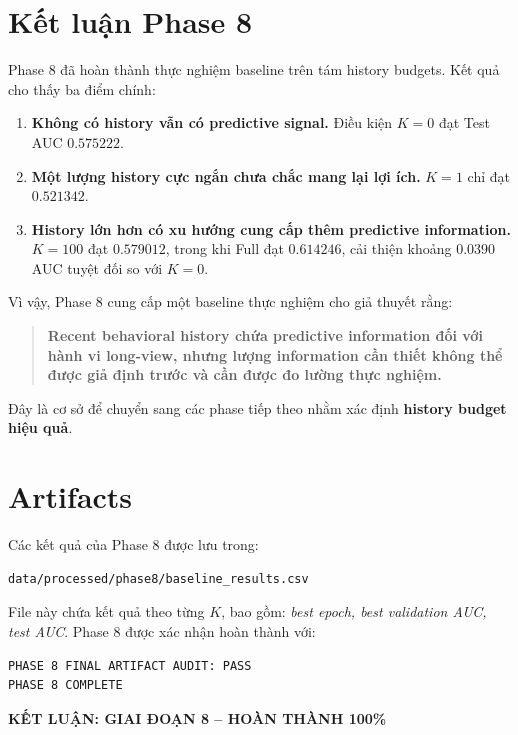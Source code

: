 \documentclass[12pt,a4paper]{article}
\begin{document}
\section{Kết luận Phase 8}

Phase 8 đã hoàn thành thực nghiệm baseline trên tám history budgets. Kết quả cho thấy ba điểm chính:
\begin{enumerate}
    \item \textbf{Không có history vẫn có predictive signal.} Điều kiện $K=0$ đạt Test AUC $0.575222$.
    \item \textbf{Một lượng history cực ngắn chưa chắc mang lại lợi ích.} $K=1$ chỉ đạt $0.521342$.
    \item \textbf{History lớn hơn có xu hướng cung cấp thêm predictive information.} $K=100$ đạt $0.579012$, trong khi Full đạt $\boxed{0.614246}$, cải thiện khoảng $0.0390$ AUC tuyệt đối so với $K=0$.
\end{enumerate}

Vì vậy, Phase 8 cung cấp một baseline thực nghiệm cho giả thuyết rằng:
\begin{quote}
\textbf{Recent behavioral history chứa predictive information đối với hành vi long-view, nhưng lượng information cần thiết không thể được giả định trước và cần được đo lường thực nghiệm.}
\end{quote}

Đây là cơ sở để chuyển sang các phase tiếp theo nhằm xác định \textbf{history budget hiệu quả}.

\section{Artifacts}

Các kết quả của Phase 8 được lưu trong:
\begin{verbatim}
data/processed/phase8/baseline_results.csv
\end{verbatim}

File này chứa kết quả theo từng $K$, bao gồm: \textit{best epoch, best validation AUC, test AUC}. Phase 8 được xác nhận hoàn thành với:

\begin{verbatim}
PHASE 8 FINAL ARTIFACT AUDIT: PASS
PHASE 8 COMPLETE
\end{verbatim}

\vspace{15pt}
\begin{center}
\large\textbf{KẾT LUẬN: GIAI ĐOẠN 8 -- HOÀN THÀNH 100\%}
\end{center}
\end{document}

